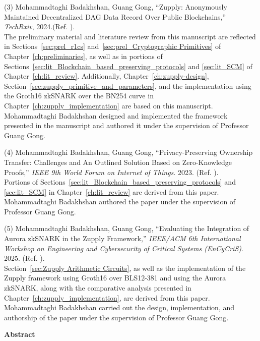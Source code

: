 \noindent (3) Mohammadtaghi Badakhshan, Guang Gong, ``Zupply: Anonymously Maintained Decentralized DAG Data Record Over Public Blockchains,'' \textit{TechRxiv}, 2024.(Ref. \cite{Badakhshan2024Zupply}). \\
The preliminary material and literature review from this manuscript are reflected in Sections~\ref{sec:prel_r1cs} and~\ref{sec:prel_Cryptographic Primitives} of Chapter~\ref{ch:preliminaries}, as well as in portions of Sections~\ref{sec:lit_Blockchain_based_preserving_protocols} and \ref{sec:lit_SCM} of Chapter~\ref{ch:lit_review}.
Additionally, Chapter~\ref{ch:zupply-design}, Section~\ref{sec:zupply_primitive_and_parameters}, and the implementation using the Groth16 zkSNARK over the BN254 curve in Chapter~\ref{ch:zupply_implementation} are based on this manuscript. Mohammadtaghi Badakhshan designed and implemented the framework presented in the manuscript and authored it under the supervision of Professor Guang Gong.

\noindent (4) Mohammadtaghi Badakhshan, Guang Gong, ``Privacy-Preserving Ownership Transfer: Challenges and An Outlined Solution Based on Zero-Knowledge Proofs,'' \textit{IEEE 9th World Forum on Internet of Things}. 2023. (Ref. \cite{Badakhshan2023Outline}).\\
Portions of Sections~\ref{sec:lit_Blockchain_based_preserving_protocols} and \ref{sec:lit_SCM} in Chapter~\ref{ch:lit_review} are derived from this paper. Mohammadtaghi Badakhshan authored the paper under the supervision of Professor Guang Gong.

\noindent (5) Mohammadtaghi Badakhshan, Guang Gong, ``Evaluating the Integration of {Aurora} {zkSNARK} in the {Zupply} Framework,'' \textit{IEEE/ACM 6th International Workshop on Engineering and Cybersecurity of Critical Systems (EnCyCriS)}. 2025. (Ref. \cite{Badakhshan2025AuroraZupply}).\\
Section~\ref{sec:Zupply Arithmetic Circuits}, as well as the implementation of the Zupply framework using Groth16 over BLS12-381 and using the Aurora zkSNARK, along with the comparative analysis presented in Chapter~\ref{ch:zupply_implementation}, are derived from this paper. Mohammadtaghi Badakhshan carried out the design, implementation, and authorship of the paper under the supervision of Professor Guang Gong.

%
\cleardoublepage
{}    %
\begin{center}\textbf{Abstract}\end{center}

